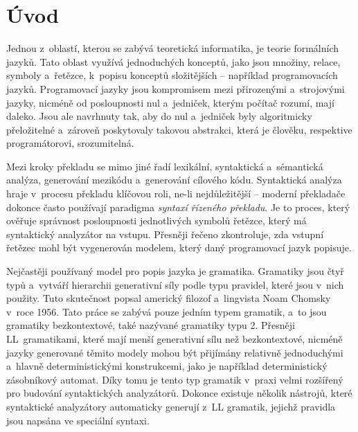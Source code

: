 
%

\chapter{Úvod}\label{kap_uvod}
Jednou z~oblastí, kterou se zabývá teoretická informatika, je teorie formálních jazyků.
Tato oblast využívá jednoduchých konceptů, jako jsou množiny, relace, symboly a~řetězce, k~popisu konceptů složitějších -- například programovacích jazyků.
Programovací jazyky jsou kompromisem mezi přirozenými a~strojovými jazyky, nicméně od posloupnosti nul a~jedniček, kterým počítač rozumí, mají daleko.
Jsou ale navrhnuty tak, aby do nul a~jedniček byly algoritmicky přeložitelné a~zároveň poskytovaly takovou abstrakci, která je člověku, respektive programátorovi, srozumitelná.  

Mezi kroky překladu se mimo jiné řadí lexikální, syntaktická a~sémantická analýza, generování mezikódu a~generování cílového kódu.
Syntaktická analýza hraje v~procesu překladu klíčovou roli, ne-li nejdůležitější -- moderní překladače dokonce často používají paradigma \emph{syntaxí řízeného překladu}.
Je to proces, který ověřuje správnost posloupnosti jednotlivých symbolů řetězce, který má syntaktický analyzátor na vstupu.
Přesněji řečeno zkontroluje, zda vstupní řetězec mohl být vygenerován modelem, který daný programovací jazyk popisuje.

Nejčastěji používaný model pro popis jazyka je gramatika.
Gramatiky jsou čtyř typů a~vytváří hierarchii generativní síly podle typu pravidel, které jsou v~nich použity.
Tuto skutečnost popsal americký filozof a~lingvista Noam Chomsky v~roce 1956.
Tato práce se zabývá pouze jedním typem gramatik, a~to jsou gramatiky bezkontextové, také nazývané gramatiky typu 2.
Přesněji LL~gramatikami, které mají menší generativní sílu než bezkontextové, nicméně jazyky generované těmito modely mohou být přijímány relativně jednoduchými a~hlavně deterministickými konstrukcemi, jako je například deterministický zásobníkový automat.
Díky tomu je tento typ gramatik v~praxi velmi rozšířený pro budování syntaktických analyzátorů.
Dokonce existuje několik nástrojů, které syntaktické analyzátory automaticky generují z~LL gramatik, jejichž pravidla jsou napsána ve speciální syntaxi.

